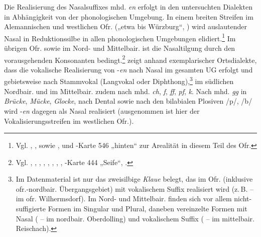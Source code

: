 Die Realisierung des Nasalsuffixes mhd. \textit{en} erfolgt in den untersuchten Dialekten in Abhängigkeit von der phonologischen Umgebung. In einem breiten Streifen im Alemannischen und westlichen Ofr. („etwa bis Würzburg“, \citealt[387]{Schirmunski1962}) wird auslautender Nasal in Reduktionssilbe in allen phonologischen Umgebungen elidiert.\footnote{Vgl. \citet[46h]{Kranzmayer1956}, \citet[401]{Rowley1990a}, \citet[143]{Brenner1895} sowie \citet[68--69]{Kemmeter1924}, \citealt[Karte 120]{SBS9.1} und \citealt{WA}-Karte 546 „hinten“ zur Arealität in diesem Teil des Ofr.} Im übrigen Ofr. sowie im Nord- und Mittelbair. ist die Nasaltilgung durch den vorausgehenden Konsonanten bedingt.\footnote{Vgl. \citet[§95.2]{Gebhardt1907}, \citet[Karte 23]{Gütter1971}, \citet[§11]{Frommann1857}, \citet[42]{Hinderling1980}, \citet[Karte 24]{Kranzmayer1956}, \citet[425]{Rowley1990b}, \citet[76--77 und Karte 19]{Rowley1997}, \citet[§582--585]{Schmeller1821}, \citealt{WA}-Karte 444 „Seife“, \citet[101--104]{Wildfeuer2001}.} 	 zeigt anhand exemplarischer Ortsdialekte, dass die vokalische Realisierung von -\textit{en} nach Nasal im gesamten UG erfolgt und gebietsweise nach Stammvokal (Langvokal oder Diphthong),\footnote{Im Datenmaterial ist nur das zweisilbige \textit{Klaue} belegt, das im Ofr. (inklusive ofr.-nordbair. Übergangsgebiet) mit vokalischem Suffix realisiert wird (z.\,B.  --  im ofr. Wilhermsdorf). Im Nord- und Mittelbair. finden sich vor allem nicht-suffigierte Formen im Singular und Plural, daneben vereinzelte Formen mit Nasal ( --  im nordbair. Oberdolling) und vokalischem Suffix ( --  im mittelbair. Reischach).} im südlichen Nordbair. und im Mittelbair. zudem nach mhd. \textit{ch}, \textit{f}, \textit{ff}, \textit{pf}, \textit{k}. Nach mhd. \textit{gg} in \textit{Brücke}, \textit{Mücke}, \textit{Glocke}, nach Dental sowie nach den bilabialen Plosiven /p/, /b/ wird -\textit{en} dagegen als Nasal realisiert (ausgenommen ist hier der Vokalisierungsstreifen im westlichen Ofr.).


